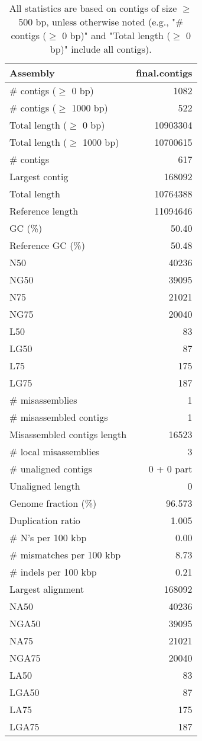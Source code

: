\documentclass[12pt,a4paper]{article}
\begin{document}
\begin{table}[ht]
\begin{center}
\caption{All statistics are based on contigs of size $\geq$ 500 bp, unless otherwise noted (e.g., "\# contigs ($\geq$ 0 bp)" and "Total length ($\geq$ 0 bp)" include all contigs).}
\begin{tabular}{|l*{1}{|r}|}
\hline
Assembly & final.contigs \\ \hline
\# contigs ($\geq$ 0 bp) & 1082 \\ \hline
\# contigs ($\geq$ 1000 bp) & 522 \\ \hline
Total length ($\geq$ 0 bp) & 10903304 \\ \hline
Total length ($\geq$ 1000 bp) & 10700615 \\ \hline
\# contigs & 617 \\ \hline
Largest contig & 168092 \\ \hline
Total length & 10764388 \\ \hline
Reference length & 11094646 \\ \hline
GC (\%) & 50.40 \\ \hline
Reference GC (\%) & 50.48 \\ \hline
N50 & 40236 \\ \hline
NG50 & 39095 \\ \hline
N75 & 21021 \\ \hline
NG75 & 20040 \\ \hline
L50 & 83 \\ \hline
LG50 & 87 \\ \hline
L75 & 175 \\ \hline
LG75 & 187 \\ \hline
\# misassemblies & 1 \\ \hline
\# misassembled contigs & 1 \\ \hline
Misassembled contigs length & 16523 \\ \hline
\# local misassemblies & 3 \\ \hline
\# unaligned contigs & 0 + 0 part \\ \hline
Unaligned length & 0 \\ \hline
Genome fraction (\%) & 96.573 \\ \hline
Duplication ratio & 1.005 \\ \hline
\# N's per 100 kbp & 0.00 \\ \hline
\# mismatches per 100 kbp & 8.73 \\ \hline
\# indels per 100 kbp & 0.21 \\ \hline
Largest alignment & 168092 \\ \hline
NA50 & 40236 \\ \hline
NGA50 & 39095 \\ \hline
NA75 & 21021 \\ \hline
NGA75 & 20040 \\ \hline
LA50 & 83 \\ \hline
LGA50 & 87 \\ \hline
LA75 & 175 \\ \hline
LGA75 & 187 \\ \hline
\end{tabular}
\end{center}
\end{table}
\end{document}
